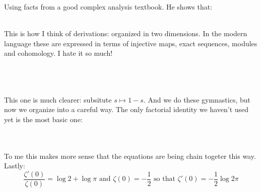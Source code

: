 \documentclass[12pt]{article}
\begin{document}
\newpage

\noindent Using facts from a good complex analysis textbook.  He shows that:\\
 \\ 
This is how I think of derivations: organized in two dimensions.   In the modern language these are expressed in terms of injective maps, exact sequences, modules and cohomology.  I hate it so much!  \\ \\
 \\ \\
This one is much clearer: subsitute $s \mapsto 1 - s$.  And we do these gymnastics, but now we organize into a careful way.  The only factorial identity we haven't used yet is the most basic one: \\ \\
 \\
To me this makes more sense that the equations are being chain togeter this way.  Lastly:
$$ \frac{\zeta'(0)}{\zeta(0)} = \log 2 + \log \pi \text{ and } \zeta(0) = - \frac{1}{2} \text{ so that } \zeta'(0) = - \frac{1}{2} \log 2\pi  $$
\end{document}
